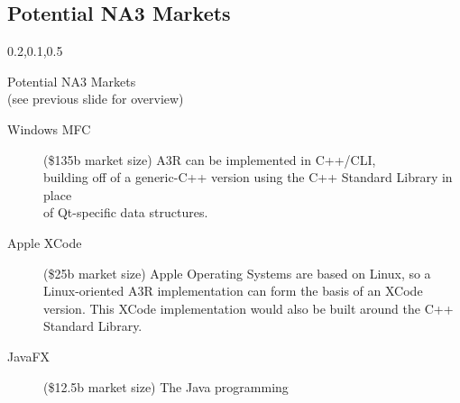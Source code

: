 
\begin{frame}{}
\section{Potential NA3 Markets}

\vspace{-3.5em}	


	
{\Large{}\selectfont
\vspace{1em}
\begin{center}
\begin{minipage}{\textwidth}
\vspace{1em}
{\begin{minipage}{\textwidth}%
\begin{lightquadblockc}{0.2,0.1,0.5}{\parbox{21cm}{\vspace*{10pt}\centering Potential NA3 Markets \\(see previous slide for overview)\vspace*{10pt}}}
\hspace{10pt}\begin{minipage}{1.1\textwidth}
{\LARGE {}\selectfont \setlength{\leftmargini}{3pt}\begin{description}
\item[Windows MFC] ({\texttildelow}\$135b market size) A3R can be implemented 
in C++/CLI, \\building off of a generic-C++ version using 
the C++ Standard Library in place \\of Qt-specific data structures.\vspace{10pt} 	
\item[Apple XCode] ({\texttildelow}\$25b market size) Apple Operating Systems 
are based on Linux, so a Linux-oriented A3R implementation can 
form the basis of an XCode version.  This XCode implementation 
would also be built around the C++ Standard Library. \vspace{10pt}
\item[JavaFX] ({\texttildelow}\$12.5b market size)  The Java programming 

\end{description}}
\end{minipage}
\end{lightquadblockc}
\end{minipage}}
\end{minipage}
\end{center}}
\end{frame}
